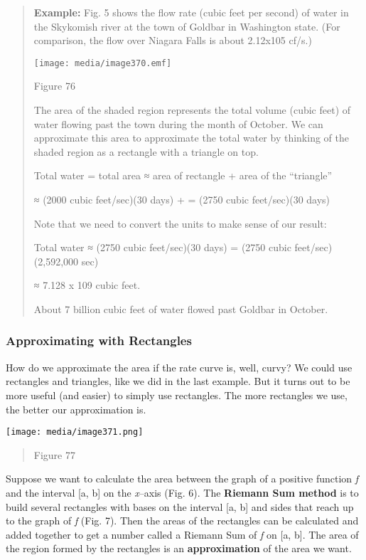 \begin{quote}
\textbf{Example:} Fig. 5 shows the flow rate (cubic feet per second) of
water in the Skykomish river at the town of Goldbar in Washington state.
(For comparison, the flow over Niagara Falls is about 2.12x105 cf/s.)

\texttt{[image: media/image370.emf]}

Figure 76

The area of the shaded region represents the total volume (cubic feet)
of water flowing past the town during the month of October. We can
approximate this area to approximate the total water by thinking of the
shaded region as a rectangle with a triangle on top.

Total water = total area ≈ area of rectangle + area of the ``triangle''

≈ (2000 cubic feet/sec)(30 days) + = (2750 cubic feet/sec)(30 days)

Note that we need to convert the units to make sense of our result:

Total water ≈ (2750 cubic feet/sec)(30 days) = (2750 cubic
feet/sec)(2,592,000 sec)

≈ 7.128 x 109 cubic feet.

About 7 billion cubic feet of water flowed past Goldbar in October.
\end{quote}

\subsubsection{}\label{section-4}

\subsubsection{Approximating with
Rectangles}\label{approximating-with-rectangles}

How do we approximate the area if the rate curve is, well, curvy? We
could use rectangles and triangles, like we did in the last example. But
it turns out to be more useful (and easier) to simply use rectangles.
The more rectangles we use, the better our approximation is.

\texttt{[image: media/image371.png]}

\begin{quote}
Figure 77
\end{quote}

Suppose we want to calculate the area between the graph of a positive
function \emph{f} and the interval {[}a, b{]} on the \emph{x}--axis
(Fig. 6). The \textbf{Riemann Sum method} is to build several rectangles
with bases on the interval {[}a, b{]} and sides that reach up to the
graph of \emph{f} (Fig. 7). Then the areas of the rectangles can be
calculated and added together to get a number called a Riemann Sum of
\emph{f} on {[}a, b{]}. The area of the region formed by the rectangles
is an \textbf{approximation} of the area we want.

